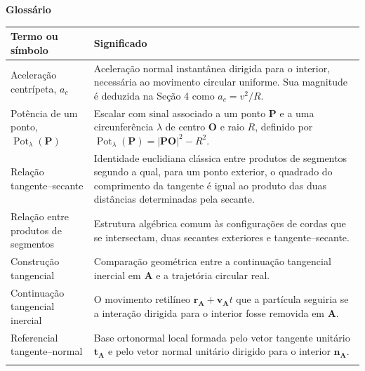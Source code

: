 \documentclass[12pt,a4paper]{article}
\newcommand{\pt}[1]{\mathbf{#1}}
\newcommand{\seglen}[1]{\lvert\mathbf{#1}\rvert}
\DeclareMathOperator{\Pot}{Pot}
\numberwithin{equation}{section}
\theoremstyle{remark}
\begin{document}
{\LARGE\bfseries Glossário}

\vspace{1.4em}

\begingroup
\footnotesize
\renewcommand{\arraystretch}{1.04}
\setlength{\tabcolsep}{6pt}

\begin{longtable}{@{}>{\raggedright\arraybackslash}p{}>{\raggedright\arraybackslash}p{}@{}}
\toprule
\textbf{Termo ou símbolo} & \textbf{Significado} \\
\midrule

Aceleração centrípeta, $a_c$ &
Aceleração normal instantânea dirigida para o interior, necessária ao movimento circular uniforme. Sua magnitude é deduzida na Seção 4 como $a_c=v^2/R$. \\
\addlinespace[11pt]

Potência de um ponto, $\Pot_{\lambda}(\pt{P})$ &
Escalar com sinal associado a um ponto $\pt{P}$ e a uma circunferência $\lambda$ de centro $\pt{O}$ e raio $R$, definido por $\Pot_{\lambda}(\pt{P})=\seglen{PO}^{2}-R^2$. \\
\addlinespace[11pt]

Relação tangente--secante &
Identidade euclidiana clássica entre produtos de segmentos segundo a qual, para um ponto exterior, o quadrado do comprimento da tangente é igual ao produto das duas distâncias determinadas pela secante. \\
\addlinespace[11pt]

Relação entre produtos de segmentos &
Estrutura algébrica comum às configurações de cordas que se intersectam, duas secantes exteriores e tangente--secante. \\
\addlinespace[11pt]

Construção tangencial &
Comparação geométrica entre a continuação tangencial inercial em $\pt{A}$ e a trajetória circular real. \\
\addlinespace[11pt]

Continuação tangencial inercial &
O movimento retilíneo $\mathbf{r}_{\pt{A}}+\mathbf{v}_{\pt{A}}t$ que a partícula seguiria se a interação dirigida para o interior fosse removida em $\pt{A}$. \\
\addlinespace[11pt]

Referencial tangente--normal &
Base ortonormal local formada pelo vetor tangente unitário $\mathbf{t}_{\pt{A}}$ e pelo vetor normal unitário dirigido para o interior $\mathbf{n}_{\pt{A}}$. \\
\addlinespace[11pt]


\end{longtable}
\end{document}
